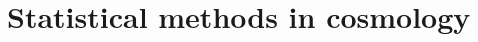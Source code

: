 \documentclass[main.tex]{subfiles}
\begin{document}
\section{Statistical methods in cosmology}
\end{document}
